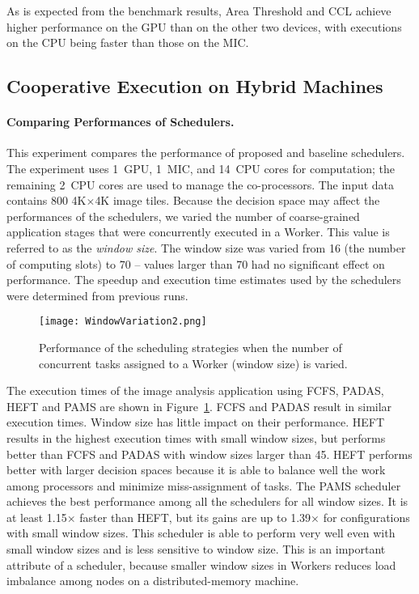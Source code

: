 As is expected from the benchmark results, Area Threshold and CCL achieve higher 
performance on the GPU than on the other two devices, with executions on the CPU 
being faster than those on the MIC. 
\subsection{Cooperative Execution on Hybrid Machines}
\paragraph{{\bf Comparing Performances of Schedulers.}}
This experiment compares the performance of proposed and baseline schedulers.
The experiment uses 1~GPU, 1~MIC, and 14~CPU cores for
computation; the remaining 2~CPU cores are used to manage the co-processors. The
input data contains 800 4K$\times$4K image tiles. Because the decision space
may affect the performances of the schedulers, we varied the number of
coarse-grained application stages that were concurrently executed in a Worker. This value 
is referred to as the {\em window size}. The window size was varied from 16 (the number of
computing slots) to 70 -- values larger than 70 had no significant effect 
on performance. The
speedup and execution time estimates used by the schedulers were determined from 
previous runs. 
\begin{figure}[h!]
	\centering
	\texttt{[image: WindowVariation2.png]}
\vspace{-2mm}
	\caption{Performance of the scheduling strategies when the number of 
	concurrent tasks assigned to a Worker (window size) is varied.}
	\label{fig:windowVariation}
\end{figure}

The execution times of the image analysis application using FCFS, PADAS, HEFT and 
PAMS are shown in Figure~\ref{fig:windowVariation}. FCFS and PADAS result in similar
execution times. Window size has little impact on their
performance. HEFT results in the highest execution times with
small window sizes, but performs better than 
FCFS and PADAS with window sizes larger than 45. HEFT performs better with larger
decision spaces because it is able to balance well the work among processors and
minimize miss-assignment of tasks.
The PAMS scheduler achieves the best performance among all the schedulers 
for all window sizes. It is at least 1.15$\times$ faster
than HEFT, but its gains are up to 1.39$\times$ for configurations with small
window sizes. This scheduler is able to perform very well even with small
window sizes and is less sensitive to window size. This is an important attribute
of a scheduler, because smaller window sizes in Workers 
reduces load imbalance among nodes on a distributed-memory machine.

